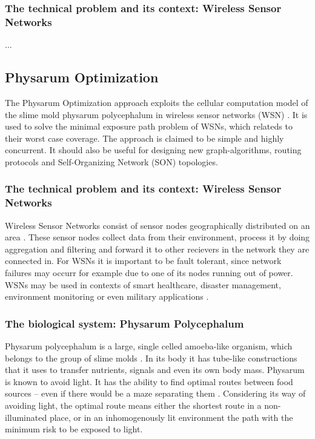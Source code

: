 \documentclass{IWORK2014}
\begin{document}
\subsubsection{The technical problem and its context: Wireless Sensor Networks}
...

\subsection{Physarum Optimization}
The Physarum Optimization approach exploits the cellular computation model of the slime mold physarum polycephalum in wireless sensor networks (WSN) \cite{liu2012physarum}. It is used to solve the minimal exposure path problem of WSNs, which relateds to their worst case coverage. The approach is claimed to be simple and highly concurrent. It should also be useful for designing new graph-algorithms, routing protocols and Self-Organizing Network (SON) topologies.

\subsubsection{The technical problem and its context: Wireless Sensor Networks}
Wireless Sensor Networks consist of sensor nodes geographically distributed on an area \cite{nazi2013robust}. These sensor nodes collect data from their environment, process it by doing aggregation and filtering and forward it to other recievers in the network they are connected in. For WSNs it is important to be fault tolerant, since network failures may occurr for example due to one of its nodes running out of power. WSNs may be used in contexts of smart healthcare, disaster management, environment monitoring \cite{nazi2013robust} or even military applications \cite{liu2012physarum}.

\subsubsection{The biological system: Physarum Polycephalum}
Physarum polycephalum is a large, single celled amoeba-like organism, which belongs to the group of slime molds \cite{liu2012physarum}. In its body it has tube-like constructions that it uses to transfer nutrients, signals and even its own body mass. Physarum is known to avoid light. It has the ability to find optimal routes between food sources -- even if there would be a maze separating them \cite{nakagaki2000intelligence}. Considering its way of avoiding light, the optimal route means either the shortest route in a non-illuminated place, or in an inhomogenously lit environment the path with the minimum risk to be exposed to light.
\end{document}
